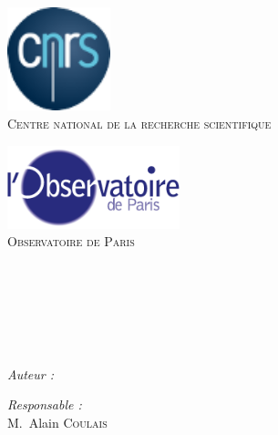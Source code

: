 
\begin{titlepage}

\begin{center}

\begin{minipage}[t]{0.48\textwidth}
  \begin{flushleft}
    \includegraphics [width=30mm]{images/logo-cnrs.png} \\[0.5cm]
      \textsc{\large Centre national de la recherche scientifique}
  \end{flushleft}
\end{minipage}
\begin{minipage}[t]{0.48\textwidth}
  \begin{flushright}
    \includegraphics [width=50mm]{images/siteon0.png} \\[0.5cm]
    \textsc{\large Observatoire de Paris}
  \end{flushright}
\end{minipage} \\[1.5cm]

\textsc{\Large \reportsubject}\\[0.5cm]
\HRule \\[0.4cm]
{\huge \bfseries \reporttitle}\\[0.4cm]
\HRule \\[1.5cm]

\begin{minipage}[t]{0.3\textwidth}
  \begin{flushleft} \large
    \emph{Auteur :}\\
    \reportauthor
  \end{flushleft}
\end{minipage}
\begin{minipage}[t]{0.6\textwidth}
  \begin{flushright} \large
    \emph{Responsable :} \\
    M.~Alain \textsc{Coulais}
  \end{flushright}
\end{minipage}


\end{center}
\end{titlepage}
